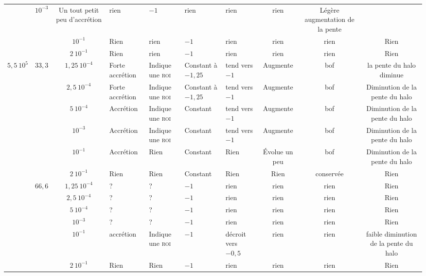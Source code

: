 \begin{table}[htbp]
{\begin{tabular}{|c|c|c|p{2cm}|p{2cm}|p{2cm}|p{2.0cm}|c|c|c|}
						& $10^{-3}$ & Un tout petit peu d'accrétion & rien & $-1$ & rien & rien & rien & Légère augmentation de la pente \tabularnewline \cline{3-10}
						& & $10^{-1}$ & Rien & rien & $-1$ & rien & rien & rien & Rien \tabularnewline \cline{3-10}
						& & $2\ 10^{-1}$ & Rien & rien & $-1$ & rien & rien & rien & Rien \tabularnewline \cline{2-10}
				\hline \multirow{12}{*}{$5,5\ 10^5$} & \multirow{6}{*}{$33,3$}
						& $1,25\ 10^{-4}$ & Forte accrétion & Indique une \textsc{roi} & Constant à $-1,25$ & tend vers $-1$ & Augmente & bof & la pente du halo diminue \tabularnewline \cline{3-10}
						& & $2,5\ 10^{-4}$ & Forte accrétion & Indique une \textsc{roi} & Constant à $-1,25$ & tend vers $-1$ & Augmente & bof & Diminution de la pente du halo \tabularnewline \cline{3-10}
						& & $5\ 10^{-4}$ & Accrétion & Indique une \textsc{roi} & Constant & tend vers $-1$ & Augmente & bof & Diminution de la pente du halo \tabularnewline \cline{3-10}
						& & $10^{-3}$ & Accrétion & Indique une \textsc{roi} & Constant & tend vers $-1$ & Augmente & bof & Diminution de la pente du halo \tabularnewline \cline{3-10}
						& & $10^{-1}$ & Accrétion & Rien & Constant & Rien & Évolue un peu & bof & Diminution de la pente du halo \tabularnewline \cline{3-10}
						& & $2\ 10^{-1}$ & Rien & Rien & Constant & Rien & Rien & conservée & Rien \tabularnewline \cline{2-10}
					& \multirow{6}{*}{$66,6$}
						& $1,25\ 10^{-4}$ & ? & ? & $-1$ & rien & rien & rien & Rien \tabularnewline \cline{3-10}
						& & $2,5\ 10^{-4}$ & ? & ? & $-1$ & rien & rien & rien & Rien \tabularnewline \cline{3-10}
						& & $5\ 10^{-4}$ & ? & ? & $-1$ & rien & rien & rien & Rien \tabularnewline \cline{3-10}
						& & $10^{-3}$ & ? & ? & $-1$ & rien & rien & rien & Rien \tabularnewline \cline{3-10}
						& & $10^{-1}$ & accrétion &  Indique une \textsc{roi} & $-1$ & décroit vers $-0,5$ & rien & rien & faible diminution de la pente du halo \tabularnewline \cline{3-10}
						& & $2\ 10^{-1}$ & Rien & Rien & $-1$ & rien & rien & rien & Rien \tabularnewline \cline{2-10}
				\hline
			\end{tabular}
			}
		\end{table}

